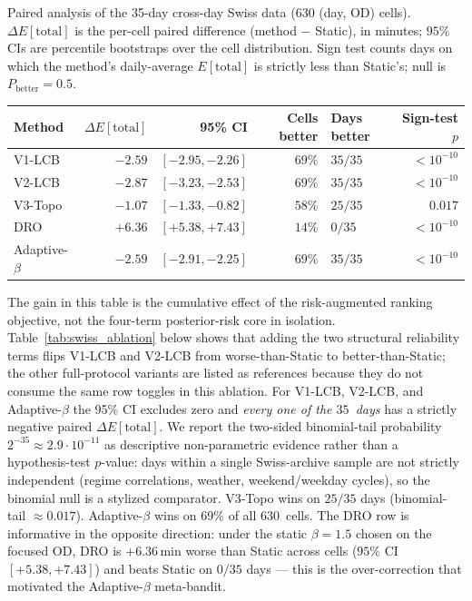 \documentclass[opre,dblanonrev]{informs4}
\begin{document}
\begin{table}
\TABLE
{Paired analysis of the 35-day cross-day Swiss data
(630 (day, OD) cells). $\Delta E[\mathrm{total}]$ is the per-cell paired
difference (method $-$ Static), in minutes; $95\%$ CIs are
percentile bootstraps over the cell distribution. Sign test counts
days on which the method's daily-average $E[\mathrm{total}]$ is
strictly less than Static's; null is $P_{\mathrm{better}}=0.5$.\label{tab:swiss_paired}}
{\begin{tabular}{l rrrl r}
\toprule
Method & $\Delta E[\mathrm{total}]$ & 95\% CI & Cells better & Days better & Sign-test $p$ \\
\midrule
V1-LCB           & $-2.59$ & $[-2.95,-2.26]$ & $69\%$ & $35/35$ & $<10^{-10}$ \\
V2-LCB           & $-2.87$ & $[-3.23,-2.53]$ & $69\%$ & $35/35$ & $<10^{-10}$ \\
V3-Topo          & $-1.07$ & $[-1.33,-0.82]$ & $58\%$ & $25/35$ & $0.017$ \\
DRO              & $+6.36$ & $[+5.38,+7.43]$ & $14\%$ & $0/35$  & $<10^{-10}$ \\
Adaptive-$\beta$ & $-2.59$ & $[-2.91,-2.25]$ & $69\%$ & $35/35$ & $<10^{-10}$ \\
\bottomrule
\end{tabular}}
{}
\end{table}

The gain in this table is the cumulative effect of the
risk-augmented ranking objective, not the four-term posterior-risk
core in isolation. Table~\ref{tab:swiss_ablation} below shows that
adding the two structural reliability terms flips V1-LCB and V2-LCB
from worse-than-Static to better-than-Static; the other full-protocol
variants are listed as references because they do not consume the
same row toggles in this ablation. For V1-LCB,
V2-LCB, and Adaptive-$\beta$ the 95\% CI excludes zero and
\emph{every one of the $35$~days} has a strictly negative paired
$\Delta E[\mathrm{total}]$. We report the two-sided binomial-tail
probability $2^{-35}\!\approx\!2.9\!\cdot\!10^{-11}$ as descriptive
non-parametric evidence rather than a hypothesis-test $p$-value:
days within a single Swiss-archive sample are not strictly
independent (regime correlations, weather, weekend/weekday cycles),
so the binomial null is a stylized comparator. V3-Topo wins on
$25/35$ days (binomial-tail $\approx 0.017$).
Adaptive-$\beta$ wins on $69\%$ of all $630$~cells. The DRO row is
informative in the opposite direction: under the static $\beta=1.5$
chosen on the focused OD, DRO is $+6.36$\,min worse than Static
across cells ($95\%$ CI $[+5.38, +7.43]$) and beats Static on
$0/35$ days --- this is the over-correction that motivated the
Adaptive-$\beta$ meta-bandit.
\end{document}
